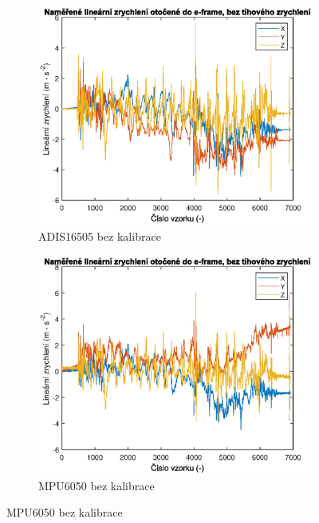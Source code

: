 \begin{figure}[h]
     \centering
     \begin{subfigure}[b]{0.49\textwidth}
         \centering
         \includegraphics[width=\textwidth]{obrazky/matlab/1adisNoCal}
         \caption{ADIS16505 bez kalibrace}   
         \label{fig:adisNoCal}  
     \end{subfigure}
     \hfill
     \centering
     \begin{subfigure}[b]{0.49\textwidth}
         \centering
         \includegraphics[width=\textwidth]{obrazky/matlab/1mpuNoCal}
         \caption{MPU6050 bez kalibrace}   
         \label{fig:mpuNoCal}  
     \end{subfigure}
     

\end{figure}
